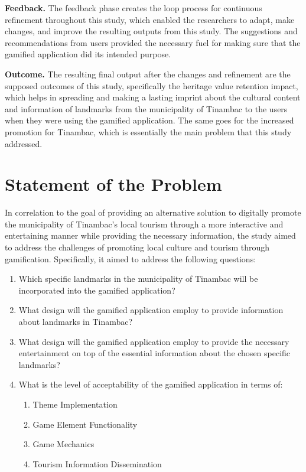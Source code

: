 \documentclass{research}
\begin{document}
\textbf{Feedback.} The feedback phase creates the loop process for continuous
refinement throughout this study, which enabled the researchers to adapt, make changes,
and improve the resulting outputs from this study. The suggestions and recommendations
from users provided the necessary fuel for making sure that the gamified application
did its intended purpose.

\textbf{Outcome.} The resulting final output after the changes and refinement are the
supposed outcomes of this study, specifically the heritage value retention impact, which
helps in spreading and making a lasting imprint about the cultural content and
information of landmarks from the municipality of Tinambac to the users when they were
using the gamified application. The same goes for the increased promotion for Tinambac,
which is essentially the main problem that this study addressed.

\section{Statement of the Problem}

In correlation to the goal of providing an alternative solution to digitally promote
the municipality of Tinambac's local tourism through a more interactive and entertaining
manner while providing the necessary information, the study aimed to address the
challenges of promoting local culture and tourism through gamification. Specifically,
it aimed to address the following questions:

\begin{enumerate}
  \item Which specific landmarks in the municipality of Tinambac will be incorporated
        into the gamified application?
  \item What design will the gamified application employ to provide information about
        landmarks in Tinambac?
  \item What design will the gamified application employ to provide the necessary
        entertainment on top of the essential information about the chosen specific
        landmarks?
  \item What is the level of acceptability of the gamified application in terms of:
    \begin{enumerate}
      \item Theme Implementation
      \item Game Element Functionality
      \item Game Mechanics
      \item Tourism Information Dissemination
    \end{enumerate}
\end{enumerate}
\end{document}
